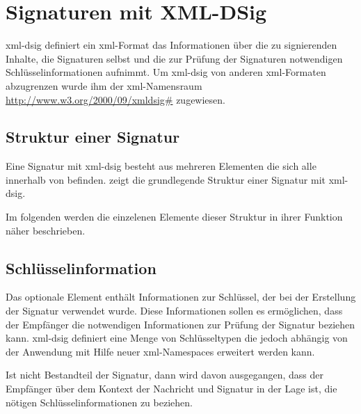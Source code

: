 
\chapter{Signaturen mit XML-DSig}
\label{chap:SignaturenXMLDSig}
\gls{xml-dsig} definiert ein \gls{xml}-Format das Informationen über die zu signierenden Inhalte, die Signaturen selbst und die zur Prüfung der Signaturen
notwendigen Schlüsselinformationen aufnimmt. Um \gls{xml-dsig} von anderen \gls{xml}-Formaten abzugrenzen wurde ihm der \gls{xml}-Namensraum
\url{http://www.w3.org/2000/09/xmldsig#} zugewiesen. 


\section{Struktur einer Signatur}
Eine Signatur mit \gls{xml-dsig} besteht aus mehreren Elementen die sich alle innerhalb von  befinden.  zeigt
die grundlegende Struktur einer Signatur mit \gls{xml-dsig}.



Im folgenden werden die einzelenen Elemente dieser Struktur in ihrer Funktion näher beschrieben. 

\section{Schlüsselinformation}
Das optionale Element  enthält Informationen zur Schlüssel, der bei der Erstellung der Signatur verwendet wurde. Diese Informationen sollen es
ermöglichen, dass der Empfänger die notwendigen Informationen zur Prüfung der Signatur beziehen kann. \gls{xml-dsig} definiert eine Menge von Schlüsseltypen die jedoch
abhängig von der Anwendung mit Hilfe neuer \gls{xml}-Namespaces erweitert werden kann.

Ist  nicht Bestandteil der Signatur, dann wird davon ausgegangen, dass der Empfänger über dem Kontext der Nachricht und Signatur in der Lage ist, die nötigen
Schlüsselinformationen zu beziehen.



